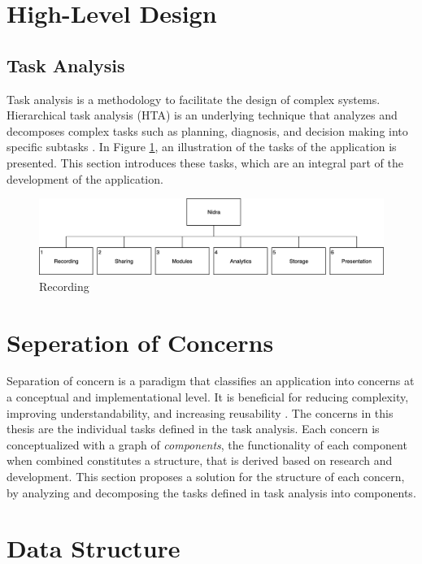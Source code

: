 

\section{High-Level Design}

\subsection{Task Analysis}
Task analysis is a methodology to facilitate the design of complex systems. Hierarchical task analysis (HTA) is an underlying technique that analyzes and decomposes complex tasks such as planning, diagnosis, and decision making into specific subtasks \cite{ta}. In Figure \ref{fig:hta_overview}, an illustration of the tasks of the application is presented. This section introduces these tasks, which are an integral part of the development of the application.

\begin{figure}
    \centering
    \includegraphics[scale=0.23]{images/TA.png}
    \caption{Recording}
    \label{fig:hta_overview}
\end{figure}



\section{Seperation of Concerns}\label{design_soc}
Separation of concern is a paradigm that classifies an application into concerns at a conceptual and implementational level. It is beneficial for reducing complexity, improving understandability, and increasing reusability \cite{soc}. The concerns in this thesis are the individual tasks defined in the task analysis. Each concern is conceptualized with a graph of \textit{components}, the functionality of each component when combined constitutes a {structure}, that is derived based on research and development. This section proposes a solution for the structure of each concern, by analyzing and decomposing the tasks defined in task analysis into components.



\section{Data Structure}

